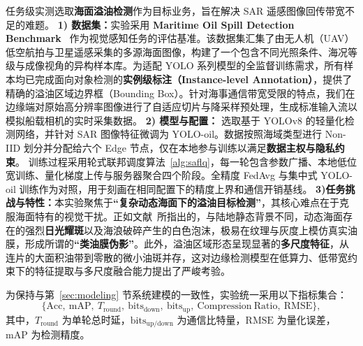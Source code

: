 任务级实测选取\textbf{海面溢油检测}作为目标业务，旨在解决 SAR 遥感图像回传带宽不足的难题。
\textbf{1) 数据集：}实验采用 \textbf{Maritime Oil Spill Detection Benchmark}~ 作为视觉感知任务的评估基准。该数据集汇集了由无人机（UAV）低空航拍与卫星遥感采集的多源海面图像，构建了一个包含不同光照条件、海况等级与成像视角的异构样本库。为适配 YOLO 系列模型的全监督训练需求，所有样本均已完成面向对象检测的\textbf{实例级标注（Instance-level Annotation）}，提供了精确的溢油区域边界框（Bounding Box）。针对海事通信带宽受限的特点，我们在边缘端对原始高分辨率图像进行了自适应切片与降采样预处理，生成标准输入流以模拟船载相机的实时采集数据。
\textbf{2) 模型与配置：} 选取基于 YOLOv8 的轻量化检测网络，并针对 SAR 图像特征微调为 YOLO\mbox{-}oil。数据按照海域类型进行 Non\mbox{-}IID 划分并分配给六个 Edge 节点，仅在本地参与训练以满足\textbf{数据主权与隐私约束}。
训练过程采用轮式联邦调度算法~\ref{alg:saflq}，每一轮包含参数广播、本地低位宽训练、量化梯度上传与服务器聚合四个阶段。全精度 FedAvg 与集中式 YOLO\mbox{-}oil 训练作为对照，用于刻画在相同配置下的精度上界和通信开销基线。
\textbf{3)任务挑战与特性：}本实验聚焦于\textbf{“复杂动态海面下的溢油目标检测”}，其核心难点在于克服海面特有的视觉干扰。正如文献~\cite{Kubat1998OilSpill}所指出的，与陆地静态背景不同，动态海面存在的强烈\textbf{日光耀斑}以及海浪破碎产生的白色泡沫，极易在纹理与灰度上模仿真实油膜，形成所谓的\textbf{“类油膜伪影”}。此外，溢油区域形态呈现显著的\textbf{多尺度特征}，从连片的大面积油带到零散的微小油斑并存，这对边缘检测模型在低算力、低带宽约束下的特征提取与多尺度融合能力提出了严峻考验。



为保持与第~\ref{sec:modeling} 节系统建模的一致性，实验统一采用以下指标集合：
\begin{equation}
	\big\{\mathrm{Acc},\ \mathrm{mAP},\ T_{\mathrm{round}},\ \mathrm{bits}_{\text{down}},\ \mathrm{bits}_{\text{up}},\ \mathrm{Compression\ Ratio},\ \mathrm{RMSE}\big\},
\end{equation}
其中，$T_{\mathrm{round}}$ 为单轮总时延，$\mathrm{bits}_{\text{up/down}}$ 为通信比特量，$\mathrm{RMSE}$ 为量化误差，$\mathrm{mAP}$ 为检测精度。

